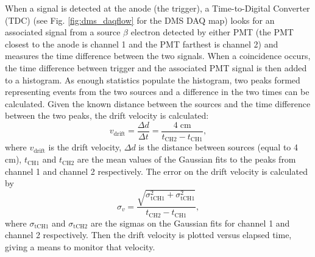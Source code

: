 When a signal is detected at the anode (the trigger), a Time-to-Digital Converter (TDC) (see Fig. \ref{fig:dms_daqflow} for the DMS DAQ map) looks for an associated signal from a source $\beta$ electron detected by either PMT (the PMT closest to the anode is channel 1 and the PMT farthest is channel 2) and measures the time difference between the two signals. When a coincidence occurs, the time difference between trigger and the associated PMT signal is then added to a histogram. As enough statistics populate the histogram, two peaks formed representing events from the two sources and a difference in the two times can be calculated. Given the known distance between the sources and the time difference between the two peaks, the drift velocity is calculated:
\begin{equation}
v_{\mathrm{drift}} = \frac{\Delta d}{\Delta t} = \frac{4 \; \mathrm{cm}}{t_{\mathrm{CH2}} - t_{\mathrm{CH1}}},
\end{equation}
where $v_{\mathrm{drift}}$ is the drift velocity, $\Delta d$ is the distance between sources (equal to 4 cm), $t_{\mathrm{CH1}}$ and $t_{\mathrm{CH2}}$ are the mean values of the Gaussian fits to the peaks from channel 1 and channel 2 respectively. The error on the drift velocity is calculated by
\begin{equation}
\sigma_v = \frac{\sqrt{\sigma_{\mathrm{tCH1}}^2 + \sigma_{\mathrm{tCH1}}^2}}{t_{\mathrm{CH2}} - t_{\mathrm{CH1}}},
\end{equation}
where $\sigma_{\mathrm{tCH1}}$ and $\sigma_{\mathrm{tCH2}}$ are the sigmas on the Gaussian fits for channel 1 and channel 2 respectively. Then the drift velocity is plotted versus elapsed time, giving a means to monitor that velocity.